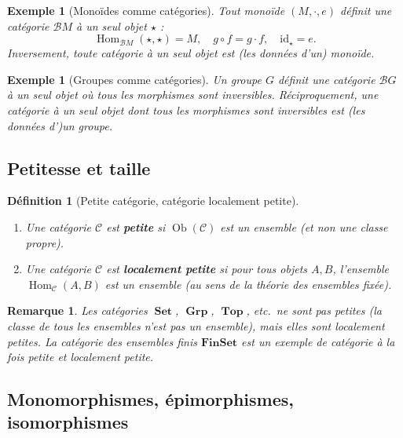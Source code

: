 \documentclass[a4paper,12pt]{book}
\DeclareMathOperator{\Hom}{Hom}
\DeclareMathOperator{\Ob}{Ob}
\DeclareMathOperator{\Set}{\mathbf{Set}}
\DeclareMathOperator{\Grp}{\mathbf{Grp}}
\DeclareMathOperator{\Top}{\mathbf{Top}}
\newcommand{\id}{\mathrm{id}}
\newtheorem{definition}[theoreme]{Définition}
\newtheorem{exemple}[theoreme]{Exemple}
\newtheorem*{remarque}{Remarque}
\begin{document}
\begin{exemple}[Monoïdes comme catégories]\label{ex:monoide-categorie}
Tout monoïde $(M, \cdot, e)$ définit une catégorie $\mathcal{B}M$ à un seul objet $\star$ :
\[
  \Hom_{\mathcal{B}M}(\star, \star) = M, \quad g \circ f = g \cdot f, \quad \id_\star = e.
\]
Inversement, toute catégorie à un seul objet est (les données d'un) monoïde.
\end{exemple}

\begin{exemple}[Groupes comme catégories]\label{ex:groupe-categorie}
Un groupe $G$ définit une catégorie $\mathcal{B}G$ à un seul objet où \emph{tous} les morphismes sont inversibles. Réciproquement, une catégorie à un seul objet dont tous les morphismes sont inversibles est (les données d')un groupe.
\end{exemple}

\subsection{Petitesse et taille}

\begin{definition}[Petite catégorie, catégorie localement petite]\label{def:petite-categorie}
\begin{enumerate}[label=(\roman*)]
  \item Une catégorie $\mathcal{C}$ est \textbf{petite} si $\Ob(\mathcal{C})$ est un ensemble (et non une classe propre).
  \item Une catégorie $\mathcal{C}$ est \textbf{localement petite} si pour tous objets $A, B$, l'ensemble $\Hom_{\mathcal{C}}(A,B)$ est un ensemble (au sens de la théorie des ensembles fixée).
\end{enumerate}
\end{definition}

\begin{remarque}
Les catégories $\Set$, $\Grp$, $\Top$, etc.\ ne sont pas petites (la classe de tous les ensembles n'est pas un ensemble), mais elles sont localement petites. La catégorie des ensembles finis $\mathbf{FinSet}$ est un exemple de catégorie à la fois petite et localement petite.
\end{remarque}

\subsection{Monomorphismes, épimorphismes, isomorphismes}
\end{document}
